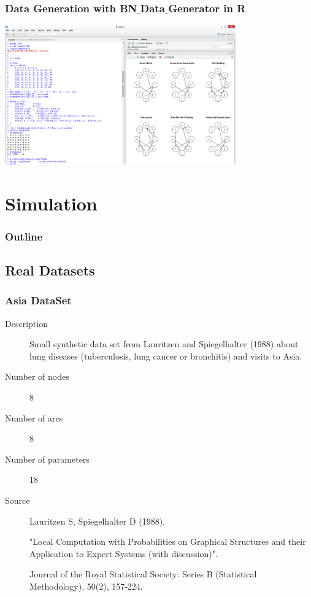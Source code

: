 \documentclass{beamer}
\begin{document}
\begin{frame}
\frametitle{Data Generation with BN$\_$Data$\_$Generator in R}
{\scriptsize{}
	\begin{center}
		\includegraphics[height=170pt]{images/image23}
	\end{center}
}
\end{frame}


\section{Simulation}

\begin{frame}
\frametitle{Outline}
{\scriptsize{}
	\tableofcontents[currentsection]
}
\end{frame}

\subsection{Real Datasets}

\begin{frame}
\frametitle{Asia DataSet}
{\scriptsize{}
\begin{description}
	\item[Description] Small synthetic data set from Lauritzen and Spiegelhalter (1988) about lung diseases (tuberculosis, lung cancer or bronchitis) and visits to Asia.
	
	\item[Number of nodes] 8
	
	\item[Number of arcs] 8
	
	\item[Number of parameters] 18
	
	\item[Source] Lauritzen S, Spiegelhalter D (1988).
	
	"Local Computation with Probabilities on Graphical Structures and their Application to Expert Systems (with discussion)".
	
	Journal of the Royal Statistical Society: Series B (Statistical Methodology), 50(2), 157-224.
\end{description}
}
\end{frame}
\end{document}
